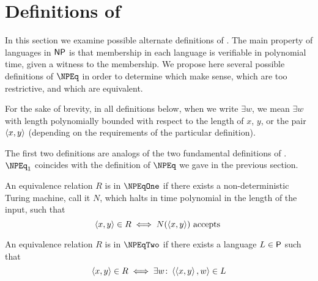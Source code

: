 \section{Definitions of \texorpdfstring{\NPEq}{NPEq}}
\label{sec:definitions}

In this section we examine possible alternate definitions of \NPEq.
The main property of languages in $\NP$ is that membership in each language is verifiable in polynomial time, given a witness to the membership.
We propose here several possible definitions of $\NPEq$ in order to determine which make sense, which are too restrictive, and which are equivalent.

For the sake of brevity, in all definitions below, when we write $\exists w$, we mean $\exists w$ with length polynomially bounded with respect to the length of $x$, $y$, or the pair $\pair{x}{y}$ (depending on the requirements of the particular definition).

The first two definitions are analogs of the two fundamental definitions of \NP.
$\NPEq_1$ coincides with the definition of $\NPEq$ we gave in the previous section.
\begin{definition}\label{def:npeq1}
  An equivalence relation $R$ is in $\NPEqOne$ if there exists a non-deterministic Turing machine, call it $N$, which halts in time polynomial in the length of the input, such that
  \begin{displaymath}
    \pair{x}{y}\in R\iff N(\pair{x}{y})\plain{accepts}
  \end{displaymath}
\end{definition}
\begin{definition}\label{def:npeq2}
  An equivalence relation $R$ is in $\NPEqTwo$ if there exists a language $L\in\P$ such that
  \begin{displaymath}
    \pair{x}{y}\in R\iff \exists w\colon \pair{\pair{x}{y}}{w}\in L
  \end{displaymath}
\end{definition}


